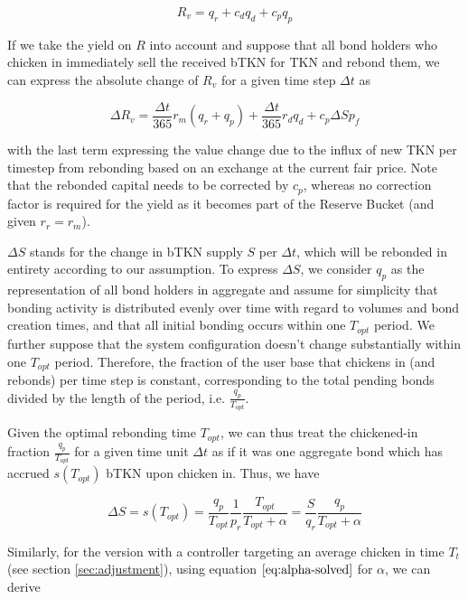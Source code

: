 \documentclass{article}
\begin{document}
\begin{equation}
  \label{eq:correction-factors}
  R_v = q_r + c_d q_d + c_p q_p
\end{equation}

If we take the yield on $R$ into account and suppose that all bond holders who chicken in immediately sell the received bTKN for TKN and rebond them, we can express the absolute change of $R_v$ for a given time step $\Delta t$ as

\begin{equation}
  \label{eq:treasury-growth}
  \Delta R_v = \frac{\Delta t}{365} r_m (q_r + q_p) + \frac{\Delta t}{365} r_d  q_d + c_p \Delta S p_f 
\end{equation}

with the last term expressing the value change due to the influx of new TKN per timestep from rebonding based on an exchange at the current fair price. Note that the rebonded capital needs to be corrected by $c_p$, whereas no correction factor is required for the yield as it becomes part of the Reserve Bucket (and given $r_r=r_m$).

$\Delta S$ stands for the change in bTKN supply $S$ per $\Delta t$, which will be rebonded in entirety according to our assumption. To express $\Delta S$, we consider $q_p$ as the representation of all bond holders in aggregate and assume for simplicity that bonding activity is distributed evenly over time with regard to volumes and bond creation times, and that all initial bonding occurs within one $T_{opt}$ period.  We further suppose that the system configuration doesn't change substantially within one $T_{opt}$ period. Therefore, the fraction of the user base that chickens in (and rebonds) per time step is constant, corresponding to the total pending bonds divided by the length of the period, i.e. $\frac{q_p}{T_{opt}}$. 

Given the optimal rebonding time $T_{opt}$, we can thus treat the chickened-in fraction $\frac{q_p}{T_{opt}}$ for a given time unit $\Delta t$ as if it was one aggregate bond which has accrued $s(T_{opt})$ bTKN upon chicken in. Thus, we have

\begin{equation}
  \label{}
  \Delta S = s(T_{opt}) = \frac{q_p}{T_{opt}} \frac{1}{p_r} \frac{T_{opt}}{T_{opt}+\alpha} = \frac{S}{q_r} \frac{q_p}{T_{opt}+\alpha}
\end{equation}

Similarly, for the version with a controller targeting an average chicken in time $T_t$ (see section \ref{sec:adjustment}), using equation $\ref{eq:alpha-solved}$ for $\alpha$, we can derive
\end{document}
